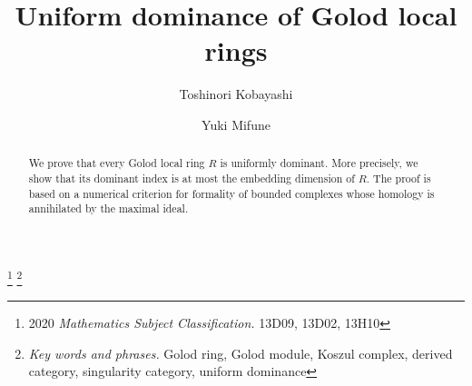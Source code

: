 \documentclass[10pt]{amsart}
\theoremstyle{definition}
\theoremstyle{remark}
\numberwithin{equation}{thm}
\begin{document}
\title{Uniform dominance of Golod local rings}
\author{Toshinori Kobayashi}
\address[Kobayashi]{School of Science and Technology, Meiji University, 1-1-1 Higashimita, Tamaku, Kawasaki 214-8571, Japan}
\author{Yuki Mifune}
\address[Mifune]{Graduate School of Mathematics, Nagoya University, Furocho, Chikusaku, Nagoya 464-8602, Japan}
\thanks{2020 {\em Mathematics Subject Classification.} 13D09, 13D02, 13H10}
\thanks{{\em Key words and phrases.} Golod ring, Golod module, Koszul complex, derived category, singularity category, uniform dominance}
\begin{abstract}
We prove that every Golod local ring $R$ is uniformly dominant. More precisely, we show that its dominant index is at most the embedding dimension of $R$. The proof is based on a numerical criterion for formality of bounded complexes whose homology is annihilated by the maximal ideal.
\end{abstract}
\maketitle
\end{document}
